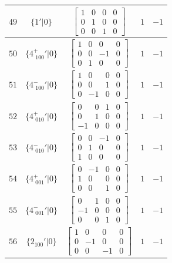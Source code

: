 \documentclass[fleqn,8pt]{jsarticle}
\begin{document}
\begin{longtable}{ccccc}
$ 49 $ & $ \{1{}'|0\} $ & $ \begin{bmatrix} 1 & 0 & 0 & 0 \\ 0 & 1 & 0 & 0 \\ 0 & 0 & 1 & 0 \end{bmatrix} $ & $ 1 $ & $ -1 $ \\ \hline
$ 50 $ & $ \{4^{+}_{\,\,100}{}'|0\} $ & $ \begin{bmatrix} 1 & 0 & 0 & 0 \\ 0 & 0 & -1 & 0 \\ 0 & 1 & 0 & 0 \end{bmatrix} $ & $ 1 $ & $ -1 $ \\ \hline
$ 51 $ & $ \{4^{-}_{\,\,100}{}'|0\} $ & $ \begin{bmatrix} 1 & 0 & 0 & 0 \\ 0 & 0 & 1 & 0 \\ 0 & -1 & 0 & 0 \end{bmatrix} $ & $ 1 $ & $ -1 $ \\ \hline
$ 52 $ & $ \{4^{+}_{\,\,010}{}'|0\} $ & $ \begin{bmatrix} 0 & 0 & 1 & 0 \\ 0 & 1 & 0 & 0 \\ -1 & 0 & 0 & 0 \end{bmatrix} $ & $ 1 $ & $ -1 $ \\ \hline
$ 53 $ & $ \{4^{-}_{\,\,010}{}'|0\} $ & $ \begin{bmatrix} 0 & 0 & -1 & 0 \\ 0 & 1 & 0 & 0 \\ 1 & 0 & 0 & 0 \end{bmatrix} $ & $ 1 $ & $ -1 $ \\ \hline
$ 54 $ & $ \{4^{+}_{\,\,001}{}'|0\} $ & $ \begin{bmatrix} 0 & -1 & 0 & 0 \\ 1 & 0 & 0 & 0 \\ 0 & 0 & 1 & 0 \end{bmatrix} $ & $ 1 $ & $ -1 $ \\ \hline
$ 55 $ & $ \{4^{-}_{\,\,001}{}'|0\} $ & $ \begin{bmatrix} 0 & 1 & 0 & 0 \\ -1 & 0 & 0 & 0 \\ 0 & 0 & 1 & 0 \end{bmatrix} $ & $ 1 $ & $ -1 $ \\ \hline
$ 56 $ & $ \{2{}_{100}{}'|0\} $ & $ \begin{bmatrix} 1 & 0 & 0 & 0 \\ 0 & -1 & 0 & 0 \\ 0 & 0 & -1 & 0 \end{bmatrix} $ & $ 1 $ & $ -1 $ \\ \hline

\end{longtable}
\end{document}
